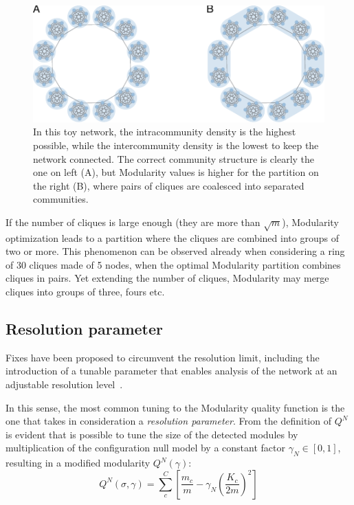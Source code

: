 \begin{figure}[htb!]
\centering
\includegraphics[width=1\textwidth]{images/traag_ring_of_cliques.pdf}
\caption{In this toy network, the intracommunity density is the highest possible, while the intercommunity density is the lowest to keep the network connected. The correct community structure is clearly the one on left (A), but Modularity values is higher for the partition on the right (B), where pairs of cliques are coalesced into separated communities.}
\label{fig:traag_ring_of_cliques}
\end{figure}
If the number of cliques is large enough (they are more than $\sqrt{m}$), Modularity optimization leads to a partition where the cliques are combined into groups of two or more. This phenomenon can be observed already when considering a ring of 30 cliques made of 5 nodes, when the optimal Modularity partition combines cliques in pairs.
Yet extending the number of cliques, Modularity may merge cliques into groups of three, fours etc.

\subsection{Resolution parameter}
Fixes have been proposed to circumvent the resolution limit, including the introduction of a tunable parameter that enables analysis of the network at an adjustable resolution level~\cite{reichardt2006,ronhovde2010,yeo2011}.

In this sense, the most common tuning to the Modularity quality function is the one that takes in consideration a \emph{resolution parameter}.
From the definition of $Q^N$ is evident that is possible to tune the size of the detected modules by multiplication of the configuration null model by a constant factor $\gamma_{N} \in [0,1]$, resulting in a modified modularity $Q^N(\gamma)$:
\begin{equation}
Q^N(\sigma,\gamma) = \sum_c^C \left[ \frac{m_c}{m} - \gamma_{N} \left( \frac{K_c}{2m}\right)^2 \right]
\end{equation}

